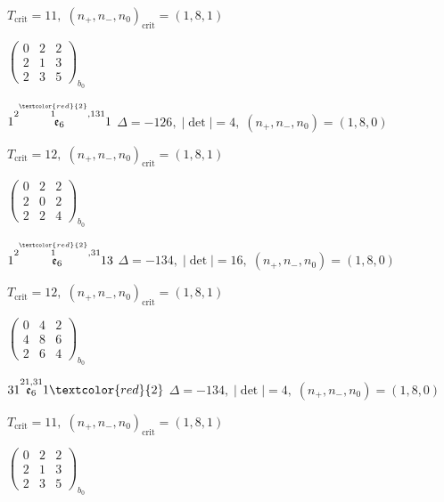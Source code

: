 \documentclass[10pt]{article}
\begin{document}
\hspace{1em}$T_{\text{crit}}=11,\; (n_+,n_-,n_0)_{\text{crit}}=(1,8,1)$

\hspace{2em}$\left(\begin{smallmatrix}0 & 2 & 2 \\ 2 & 1 & 3 \\ 2 & 3 & 5\end{smallmatrix}\right)_{\!b_0}$

\smallskip

$1\overset{2\overset{\textcolor{red}{2}}{1},131}{\mathfrak{e}_6}1$ \quad $\Delta=-126,\; |\det|=4,\; (n_+,n_-,n_0)=(1,8,0)$

\hspace{1em}$T_{\text{crit}}=12,\; (n_+,n_-,n_0)_{\text{crit}}=(1,8,1)$

\hspace{2em}$\left(\begin{smallmatrix}0 & 2 & 2 \\ 2 & 0 & 2 \\ 2 & 2 & 4\end{smallmatrix}\right)_{\!b_0}$

\smallskip

$1\overset{2\overset{\textcolor{red}{2}}{1},31}{\mathfrak{e}_6}13$ \quad $\Delta=-134,\; |\det|=16,\; (n_+,n_-,n_0)=(1,8,0)$

\hspace{1em}$T_{\text{crit}}=12,\; (n_+,n_-,n_0)_{\text{crit}}=(1,8,1)$

\hspace{2em}$\left(\begin{smallmatrix}0 & 4 & 2 \\ 4 & 8 & 6 \\ 2 & 6 & 4\end{smallmatrix}\right)_{\!b_0}$

$31\overset{21,31}{\mathfrak{e}_6}1\textcolor{red}{2}$ \quad $\Delta=-134,\; |\det|=4,\; (n_+,n_-,n_0)=(1,8,0)$

\hspace{1em}$T_{\text{crit}}=11,\; (n_+,n_-,n_0)_{\text{crit}}=(1,8,1)$

\hspace{2em}$\left(\begin{smallmatrix}0 & 2 & 2 \\ 2 & 1 & 3 \\ 2 & 3 & 5\end{smallmatrix}\right)_{\!b_0}$
\end{document}
